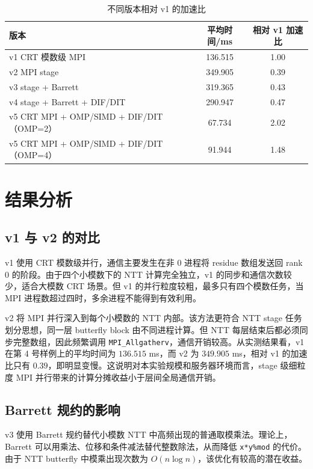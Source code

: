 \documentclass[a4paper]{article}
\begin{document}
\begin{table}[H]
  \centering
  \caption{不同版本相对 v1 的加速比}
  \label{tab:speedup}
  \begin{tabular}{l c c}
    \toprule
    版本 & 平均时间/ms & 相对 v1 加速比 \\
    \midrule
    v1 CRT 模数级 MPI & 136.515 & 1.00 \\
    v2 MPI stage & 349.905 & 0.39 \\
    v3 stage + Barrett & 319.365 & 0.43 \\
    v4 stage + Barrett + DIF/DIT & 290.947 & 0.47 \\
    v5 CRT MPI + OMP/SIMD + DIF/DIT（OMP=2） & 67.734 & 2.02 \\
    v5 CRT MPI + OMP/SIMD + DIF/DIT（OMP=4） & 91.944 & 1.48 \\
    \bottomrule
  \end{tabular}
\end{table}

\section{结果分析}

\subsection{v1 与 v2 的对比}

v1 使用 CRT 模数级并行，通信主要发生在非 0 进程将 residue 数组发送回 rank 0 的阶段。由于四个小模数下的 NTT 计算完全独立，v1 的同步和通信次数较少，适合大模数 CRT 场景。但 v1 的并行粒度较粗，最多只有四个模数任务，当 MPI 进程数超过四时，多余进程不能得到有效利用。

v2 将 MPI 并行深入到每个小模数的 NTT 内部。该方法更符合 NTT stage 任务划分思想，同一层 butterfly block 由不同进程计算。但 NTT 每层结束后都必须同步完整数组，因此频繁调用 \texttt{MPI\_Allgatherv}，通信开销较高。从实测结果看，v1 在第 4 号样例上的平均时间为 $136.515$ ms，而 v2 为 $349.905$ ms，相对 v1 的加速比只有 $0.39$，即明显变慢。这说明对本实验规模和服务器环境而言，stage 级细粒度 MPI 并行带来的计算分摊收益小于层间全局通信开销。

\subsection{Barrett 规约的影响}

v3 使用 Barrett 规约替代小模数 NTT 中高频出现的普通取模乘法。理论上，Barrett 可以用乘法、位移和条件减法替代整数除法，从而降低 \texttt{x*y\%mod} 的代价。由于 NTT butterfly 中模乘出现次数为 $O(n\log n)$，该优化有较高的潜在收益。
\end{document}
